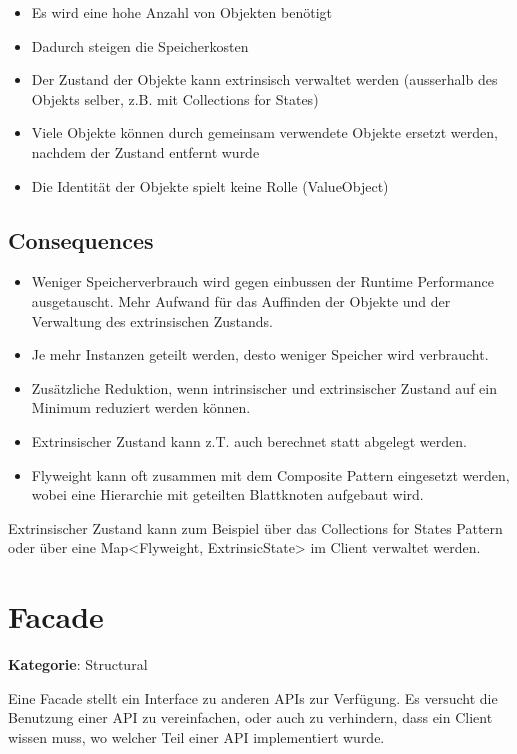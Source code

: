 \begin{itemize}
	\item Es wird eine hohe Anzahl von Objekten benötigt
	\item Dadurch steigen die Speicherkosten
	\item Der Zustand der Objekte kann extrinsisch verwaltet werden (ausserhalb des Objekts selber, z.B. mit Collections for States)
	\item Viele Objekte können durch gemeinsam verwendete Objekte ersetzt werden, nachdem der Zustand entfernt wurde
	\item Die Identität der Objekte spielt keine Rolle (ValueObject)
\end{itemize}

\subsection*{Consequences}

\begin{itemize}
	\item Weniger Speicherverbrauch wird gegen einbussen der Runtime Performance ausgetauscht. Mehr Aufwand für das Auffinden der Objekte und der Verwaltung des extrinsischen Zustands.
	\item Je mehr Instanzen geteilt werden, desto weniger Speicher wird verbraucht.
	\item Zusätzliche Reduktion, wenn intrinsischer und extrinsischer Zustand auf ein Minimum reduziert werden können.
	\item Extrinsischer Zustand kann z.T. auch berechnet statt abgelegt werden.
	\item Flyweight kann oft zusammen mit dem Composite Pattern eingesetzt werden, wobei eine Hierarchie mit geteilten Blattknoten aufgebaut wird.
\end{itemize}

Extrinsischer Zustand kann zum Beispiel über das Collections for States Pattern oder über eine Map<Flyweight, ExtrinsicState> im Client verwaltet werden.

\section{Facade}
\textbf{Kategorie}: Structural

Eine Facade stellt ein Interface zu anderen APIs zur Verfügung. Es versucht die Benutzung einer API zu vereinfachen, oder auch zu verhindern, dass ein Client wissen muss, wo welcher Teil einer API implementiert wurde.

